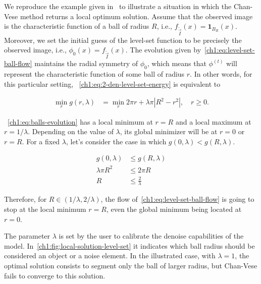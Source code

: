We reproduce the example given in~\cite{chan06} to illustrate a situation in which the Chan-Vese method returns a local optimum solution. Assume that the observed image is the characteristic function of a ball of radius $R$, i.e., $f_{\widetilde{\vec{I}}}(x) = \mathbf{1}_{B_R}(x)$. Moreover, we set the initial guess of the level-set function to be precisely the observed image, i.e., $\phi_0(x) = f_{\widetilde{\vec{I}}}(x)$. The evolution given by~\cref{ch1:eq:level-set-ball-flow} maintains the radial symmetry of $\phi_0$, which means that $\phi^{(t)}$ will represent the characteristic function of some ball of radius $r$. In other words, for this particular setting, ~\cref{ch1:eq:2-den-level-set-energy} is equivalent to

\begin{align}
	\min_{r} g(r,\lambda) &= \min_r 2\pi r + \lambda \pi |R^2-r^2|, \quad r \geq 0.
	\label{ch1:eq:balls-evolution}
\end{align}


~\cref{ch1:eq:balls-evolution} has a local minimum at $r=R$ and a local maximum at $r=1/\lambda$. Depending on the value of $\lambda$, its global minimizer will be at $r=0$ or $r=R$. For a fixed $\lambda$, let's consider the case in which $g(0,\lambda) < g(R,\lambda)$.

\begin{align*}
	g(0,\lambda) &\leq g(R,\lambda) \\
	\lambda \pi R^2 &\leq 2\pi R \\
	R &\leq \frac{2}{\lambda}
\end{align*}

Therefore, for $R \in (1/\lambda, 2/\lambda)$, the flow of~\cref{ch1:eq:level-set-ball-flow} is going to stop at the local minimum $r=R$, even the global minimum being located at $r=0$. 

The parameter $\lambda$ is set by the user to calibrate the denoise capabilities of the model. In~\cref{ch1:fig:local-solution-level-set} it indicates which ball radius should be considered an object or a noise element. In the illustrated case, with $\lambda=1$, the optimal solution consists to segment only the ball of larger radius, but Chan-Vese fails to converge to this solution.

